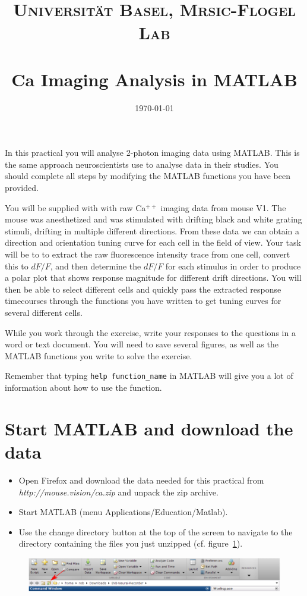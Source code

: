 \documentclass[paper=a4, fontsize=11pt]{scrartcl} %
\title{%
\normalfont \normalsize 
\textsc{Universit\"{a}t Basel, Mrsic-Flogel Lab} \\ [25pt] %
\horrule{0.5pt} \\[0.2cm] %
\huge Ca\supr{++} Imaging Analysis in MATLAB
\horrule{1.5pt}\\ %
}
\author{}
\date{\normalsize\today} %
\numberwithin{equation}{section} %
\numberwithin{figure}{section} %
\numberwithin{table}{section} %
\newcommand{\supr}[1]{\ensuremath{^{#1}}}
\begin{document}
\maketitle %

In this practical you will analyse 2-photon imaging data using MATLAB. This is the same approach 
neuroscientists use to analyse data in their studies. You should complete all steps by modifying the 
MATLAB functions you have been provided.

You will be supplied with with raw Ca\supr{++} imaging data from mouse V1. The mouse 
was anesthetized and was stimulated with drifting black and white grating stimuli, drifting in multiple different directions. From these data
we can obtain a direction and orientation tuning curve for each cell in the field of view. Your task will be to to 
extract the raw fluorescence intensity trace from one cell, convert this to $dF/F$, and then 
determine the $dF/F$ for each stimulus in order to produce a polar plot that shows response magnitude
for different drift directions. You will then be able to select different cells and quickly pass the extracted 
response timecourses through the functions you have written to get tuning curves for several 
different cells. 

While you work through the exercise, write your responses to the questions in a word or text document. You will need to save several figures, as well as the MATLAB functions you write to solve the exercise.

Remember that typing \texttt{help function\_name} in MATLAB will give you a lot of information about how to use the function.


\section{Start MATLAB and download the data}
\begin{itemize}
\setlength{\parskip}{0.25em}
\item Open Firefox and download the data needed for this practical from \textit{http://mouse.vision/ca.zip} and unpack the zip archive.
\item Start MATLAB (menu Applications/Education/Matlab).
\item Use the change directory button at the top of the screen to navigate to the 
  directory containing the files you just unzipped (cf. figure~\ref{fig:toolbar}). 
\end{itemize}

\begin{figure}
    \centering
    \includegraphics[width=\textwidth]{change_dir.eps}
    \caption{}
    \label{fig:toolbar}
\end{figure}
\end{document}
